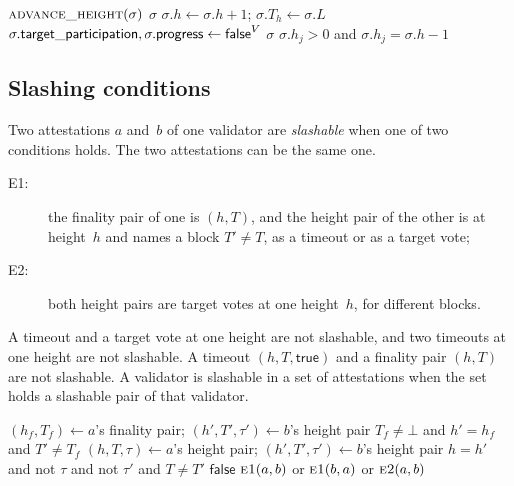 {\begin{algorithmic}[1]
    \State \Return $\Call{advance\_height}{\sigma}$
  \EndIf
  \State \Return $\sigma$
\EndFunction
\vspace{1pt}
  \State $\sigma.h\gets\sigma.h+1$; \quad $\sigma.T_h\gets\sigma.L$
  \State $\sigma.\mathsf{target\_participation},
    \sigma.\mathsf{progress}\gets\mathsf{false}^{V}$
  \State \Return $\sigma$
\EndFunction
\vspace{1pt}
  \State \Return $\sigma.h_j>0$ and $\sigma.h_j=\sigma.h-1$
\EndFunction
\end{algorithmic}
}

\subsection{Slashing conditions}\label{sec:fg-slashing}

Two attestations $a$ and~$b$ of one validator are \emph{slashable} when
one of two conditions holds.  The two attestations can be the same one.
\begin{description}
 \item[E1:] the finality pair of one is $(h,T)$, and the height pair of
   the other is at height~$h$ and names a block $T'\neq T$, as a timeout
   or as a target vote;
 \item[E2:] both height pairs are target votes at one height~$h$, for
   different blocks.
\end{description}
A timeout and a target vote at one height are not slashable, and two
timeouts at one height are not slashable.  A timeout $(h,T,\mathsf{true})$
and a finality pair $(h,T)$ are not slashable.  A validator is slashable in a
set of attestations when the set holds a slashable pair of that validator.

\label{alg:fg-slashing}
\nopagebreak
{\footnotesize
\begin{algorithmic}[1]
  \State $(h_f,T_f)\gets a$'s finality pair;\quad
    $(h',T',\tau')\gets b$'s height pair
  \State \Return $T_f\neq\bot$ and $h'=h_f$ and $T'\neq T_f$
\EndFunction
\vspace{1pt}
  \State $(h,T,\tau)\gets a$'s height pair;\quad
    $(h',T',\tau')\gets b$'s height pair
  \State \Return $h=h'$ and not $\tau$ and not $\tau'$ and $T\neq T'$
\EndFunction
\vspace{1pt}
   \State \Return $\mathsf{false}$ \EndIf
  \State \Return $\Call{e1}{a,b}$ or $\Call{e1}{b,a}$ or $\Call{e2}{a,b}$
\EndFunction
\end{algorithmic}
}
